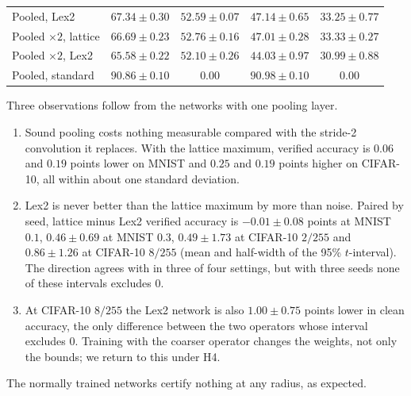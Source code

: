 \begin{table}[h]
\begin{tabular}{lcccc}
Pooled, Lex2      & $67.34\pm0.30$ & $52.59\pm0.07$ & $47.14\pm0.65$ & $33.25\pm0.77$ \\
Pooled $\times2$, lattice & $66.69\pm0.23$ & $52.76\pm0.16$ & $47.01\pm0.28$ & $33.33\pm0.27$ \\
Pooled $\times2$, Lex2    & $65.58\pm0.22$ & $52.10\pm0.26$ & $44.03\pm0.97$ & $30.99\pm0.88$ \\
Pooled, standard  & $90.86\pm0.10$ & $0.00$ & $90.98\pm0.10$ & $0.00$ \\
\bottomrule
\end{tabular}
\end{table}

Three observations follow from the networks with one pooling layer.
\begin{enumerate}[leftmargin=*]
\item Sound pooling costs nothing measurable compared with the stride-2 convolution it replaces. With the lattice maximum, verified accuracy is $0.06$ and $0.19$ points lower on MNIST and $0.25$ and $0.19$ points higher on CIFAR-10, all within about one standard deviation.
\item Lex2 is never better than the lattice maximum by more than noise. Paired by seed, lattice minus Lex2 verified accuracy is $-0.01\pm0.08$ points at MNIST $0.1$, $0.46\pm0.69$ at MNIST $0.3$, $0.49\pm1.73$ at CIFAR-10 $2/255$ and $0.86\pm1.26$ at CIFAR-10 $8/255$ (mean and half-width of the 95\% $t$-interval). The direction agrees with  in three of four settings, but with three seeds none of these intervals excludes $0$.
\item At CIFAR-10 $8/255$ the Lex2 network is also $1.00\pm0.75$ points lower in clean accuracy, the only difference between the two operators whose interval excludes $0$. Training with the coarser operator changes the weights, not only the bounds; we return to this under H4.
\end{enumerate}
The normally trained networks certify nothing at any radius, as expected.

